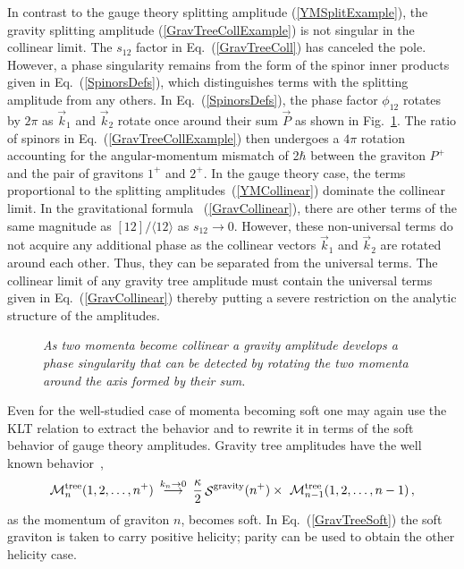 \documentclass[12pt]{livrev}
\begin{document}
In contrast to the gauge theory splitting amplitude
(\ref{YMSplitExample}), the gravity splitting amplitude
(\ref{GravTreeCollExample}) is not singular in the collinear limit.
The $s_{12}$ factor in Eq.~(\ref{GravTreeColl}) has canceled the
pole. However, a phase singularity remains from the form of the spinor
inner products given in Eq.~(\ref{SpinorsDefs}), which distinguishes
terms with the splitting amplitude from any others.  In
Eq.~(\ref{SpinorsDefs}), the phase factor $\phi_{12}$ rotates by
$2\pi$ as $\vec k_1$ and $\vec k_2$ rotate once around their sum $\vec
P$ as shown in Fig.~\ref{figure:RotCol}.  The ratio of spinors in
Eq.~(\ref{GravTreeCollExample}) then undergoes a $4\pi$ rotation
accounting for the angular-momentum mismatch of 2$\hbar$ between the
graviton $P^+$ and the pair of gravitons $1^+$ and $2^+$.  In the gauge
theory case, the terms proportional to the splitting
amplitudes~(\ref{YMCollinear}) dominate the collinear limit.
In the gravitational formula ~(\ref{GravCollinear}),
there are other terms of the same magnitude as $[{1}{2}]/
\langle{1}{2}\rangle$ as $s_{12} \to 0$. However, these non-universal
terms do not acquire any additional phase as the collinear vectors
$\vec k_1$ and $\vec k_2$ are rotated around each other. Thus, they
can be separated from the universal terms.  The collinear limit of any
gravity tree amplitude must contain the universal terms given in
Eq.~(\ref{GravCollinear}) thereby putting a severe restriction on the
analytic structure of the amplitudes.


\begin{figure}[h]
  \def\epsfsize#1#2{0.6#1} \centerline{}
  \caption{\it As two momenta become collinear a gravity amplitude
  develops a phase singularity that can be detected by rotating
  the two momenta around the axis formed by their sum.}
  \label{figure:RotCol}
\end{figure}


Even for the well-studied case of momenta becoming soft one may again use
the KLT relation to extract the behavior and to rewrite it in terms of
the soft behavior of gauge theory amplitudes.  Gravity tree amplitudes
have the well known behavior~\cite{WeinbergSoftG},
%
\begin{equation}
{\cal M}_n^{\rm tree}(1,2,\ldots,n^+)\ \mathop{\longrightarrow}^{k_n\to0}\
   {\kappa\over2} \, {\mathop {\cal S} \nolimits}^{\rm gravity}(n^+) \times\ 
   {\cal M}_{n-1}^{\rm tree}(1,2,\ldots,n-1) \,,
\label{GravTreeSoft}
\end{equation}
%
as the momentum of graviton $n$, becomes soft.  In
Eq.~(\ref{GravTreeSoft}) the soft graviton is taken to carry positive
helicity; parity can be used to obtain the other helicity case. 
\end{document}
